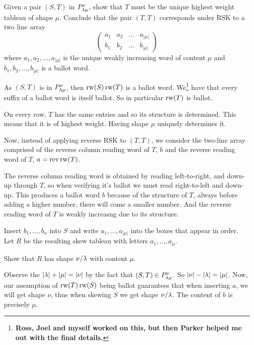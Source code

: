 \documentclass[12pt]{memoir}
\begin{document}
\begin{Ej}[7(b)]
    Given a pair $(S, T )$ in $P^\nu_{\lambda\mu}$, show that $T$ must be the unique highest weight tableau of shape $\mu$. Conclude that the pair $(T, T )$ corresponds under RSK to a two line array
    $$
    \begin{pmatrix}
        a_1&a_2&\dots&a_{|\mu|}\\
        b_1&b_2&\dots&b_{|\mu|}
    \end{pmatrix}
    $$
where $a_1,a_2,\dots,a_{|\mu|}$ is the unique weakly increasing word of content $\mu$ and $b_1,b_2,\dots,b_{|\mu|}$ is a ballot word.
\end{Ej}

\begin{ptcbr}
    As $(S,T)$ is in $P^{\nu}_{\lambda\mu}$, then $\operatorname{rw}(S)\operatorname{rw}(T)$ is a ballot word. We\footnote{\bfseries Ross, Joel and myself worked on this, but then Parker helped me out with the final details.} have that every suffix of a ballot word is itself ballot. So in particular $\operatorname{rw}(T)$ is ballot.\par
    On every row, $T$ has the same entries and so its structure is determined. This means that it is of highest weight. Having shape $\mu$ uniquely determines it.\par
    Now, instead of applying reverse RSK to $(T,T)$, we consider the two-line array comprised of the reverse column reading word of $T$, $b$ and the reverse reading word of $T$, $a=\operatorname{rev}\operatorname{rw}(T)$.\par
    The reverse column reading word is obtained by reading left-to-right, and down-up through $T$, so when verifying it's ballot we must read right-to-left and down-up. This produces a ballot word $b$ because of the structure of $T$, always before adding a higher number, there will come a smaller number. And the reverse reading word of $T$ is weakly increasng due to its structure.
\end{ptcbr}

\begin{Ej}[7(c)(i)]
    Insert $b_1,\dots,b_n$ into $S$ and write $a_1,\dots,a_{|\mu|}$ into the boxes that appear in order. Let $R$ be the
resulting skew tableau with letters $a_1,\dots,a_\mu$.\par
Show that $R$ has shape $\nu/\lambda$ with content $\mu$.
\end{Ej}

\begin{ptcbr}
    Observe the $|\lambda|+|\mu|=|\nu|$ by the fact that $(S,T)\in P^\nu_{\lambda\mu}$. So $|\nu|-|\lambda|=|\mu|$. Now, our assumption of $\operatorname{rw}(T)\operatorname{rw}(S)$ being ballot guarantees that when inserting $a$, we will get shape $\nu$, thus when skewing $S$ we get shape $\nu/\lambda$. The content of $b$ is precisely $\mu$.
\end{ptcbr}
\end{document}
